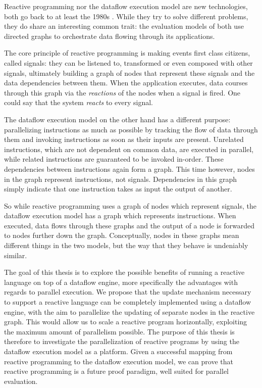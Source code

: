 Reactive programming nor the dataflow execution model are new technologies, both go back to at least the 1980s \citep{harel_development_1985, veen_dataflow_1986}. While they try to solve different problems, they do share an interesting common trait: the evaluation models of both use directed graphs to orchestrate data flowing through its applications. 

The core principle of reactive programming is making events first class citizens, called signals: they can be listened to, transformed or even composed with other signals, ultimately building a graph of nodes that represent these signals and the data dependencies between them. When the application executes, data courses through this graph via the \textit{reactions} of the nodes when a signal is fired. One could say that the system \textit{reacts} to every signal.

The dataflow execution model on the other hand has a different purpose: parallelizing instructions as much as possible by tracking the flow of data through them and invoking instructions as soon as their inputs are present. Unrelated instructions, which are not dependent on common data, are executed in parallel, while related instructions are guaranteed to be invoked in-order. These dependencies between instructions again form a graph. This time however, nodes in the graph represent instructions, not signals. Dependencies in this graph simply indicate that one instruction takes as input the output of another. 

So while reactive programming uses a graph of nodes which represent signals, the dataflow execution model has a graph which represents instructions. When executed, data flows through these graphs and the output of a node is forwarded to nodes further down the graph. Conceptually, nodes in these graphs mean different things in the two models, but the way that they behave is undeniably similar.

The goal of this thesis is to explore the possible benefits of running a reactive language on top of a dataflow engine, more specifically the advantages with regards to parallel execution. We propose that the update mechanism necessary to support a reactive language can be completely implemented using a dataflow engine, with the aim to parallelize the updating of separate nodes in the reactive graph. 
This would allow us to scale a reactive program horizontally, exploiting the maximum amount of parallelism possible. The purpose of this thesis is therefore to investigate the parallelization of reactive programs by using the dataflow execution model as a platform. Given a successful mapping from reactive programming to the dataflow execution model, we can prove that reactive programming is a future proof paradigm, well suited for parallel evaluation. 

